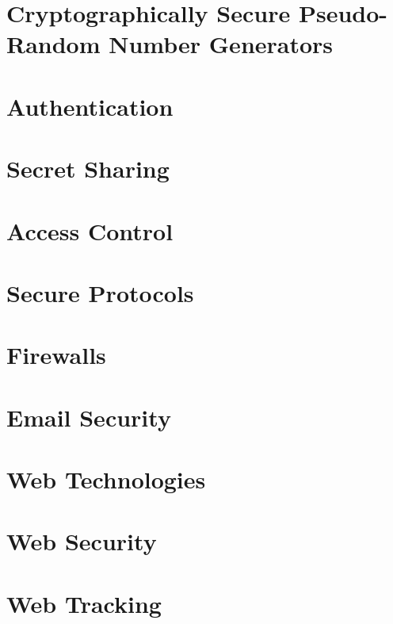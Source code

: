 	\newpage
	\section{Cryptographically Secure Pseudo-Random Number Generators}
	
	\newpage
	\section{Authentication}
	
	\newpage
	\section{Secret Sharing}

	\newpage
	\section{Access Control}

	\newpage
	\section{Secure Protocols}
	
	\newpage
	\section{Firewalls}

	\newpage
	\section{Email Security}

	\newpage
	\section{Web Technologies}	
	
	\newpage
	\section{Web Security}	
	
	\newpage
	\section{Web Tracking}	
		
